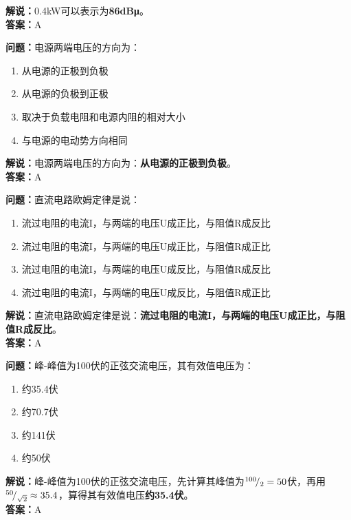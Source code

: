 \textbf{解说：}0.4kW可以表示为\textbf{86dBμ}。\\\textbf{答案：}A%



\textbf{问题：}电源两端电压的方向为：

\begin{enumerate}[label=\Alph*), leftmargin=1cm]
	\item 从电源的正极到负极
	\item 从电源的负极到正极
	\item 取决于负载电阻和电源内阻的相对大小
	\item 与电源的电动势方向相同
\end{enumerate}

\textbf{解说：}电源两端电压的方向为：\textbf{从电源的正极到负极}。\\\textbf{答案：}A



\textbf{问题：}直流电路欧姆定律是说：

\begin{enumerate}[label=\Alph*), leftmargin=1cm]
	\item 流过电阻的电流I，与两端的电压U成正比，与阻值R成反比
	\item 流过电阻的电流I，与两端的电压U成正比，与阻值R成正比
	\item 流过电阻的电流I，与两端的电压U成反比，与阻值R成反比
	\item 流过电阻的电流I，与两端的电压U成反比，与阻值R成正比
\end{enumerate}

\textbf{解说：}直流电路欧姆定律是说：\textbf{流过电阻的电流I，与两端的电压U成正比，与阻值R成反比}。\\\textbf{答案：}A%



\textbf{问题：}峰-峰值为100伏的正弦交流电压，其有效值电压为：

\begin{enumerate}[label=\Alph*), leftmargin=1cm]
	\item 约35.4伏
	\item 约70.7伏
	\item 约141伏
	\item 约50伏
\end{enumerate}

\textbf{解说：}峰-峰值为100伏的正弦交流电压，先计算其峰值为\({}^{100}\!/_{2}=50\)伏，再用\({}^{50}\!/_{\sqrt{2}}\approx35.4\)，算得其有效值电压\textbf{约35.4伏}。\\\textbf{答案：}A%



